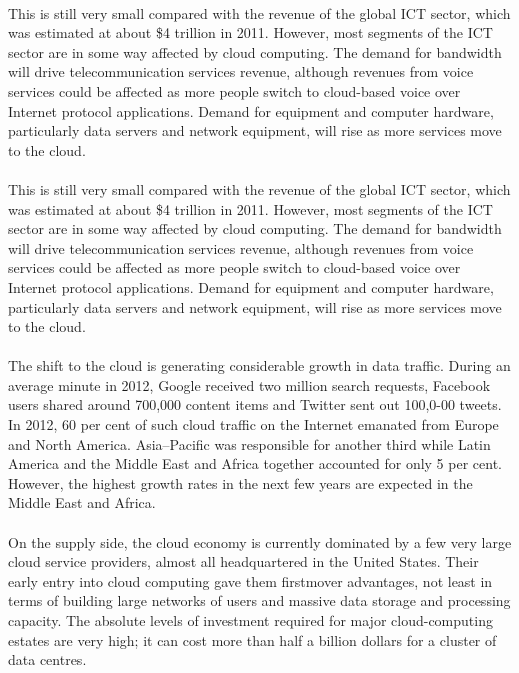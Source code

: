 \documentclass[a4paper, UTF8, 12pt]{article}
\begin{document}
\paragraph*{}
    This is still very small compared with the revenue of the global ICT sector, which was estimated at about \$4 trillion in 2011. However, most segments of the ICT sector are in some way affected by cloud computing. The demand for bandwidth will drive telecommunication services revenue, although revenues from voice services could be affected as more people switch to cloud-based voice over Internet protocol applications. Demand for equipment and computer hardware, particularly data servers and network equipment, will rise as more services move to the cloud. 

\paragraph*{}
    This is still very small compared with the revenue of the global ICT sector, which was estimated at about \$4 trillion in 2011. However, most segments of the ICT sector are in some way affected by cloud computing. The demand for bandwidth will drive telecommunication services revenue, although revenues from voice services could be affected as more people switch to cloud-based voice over Internet protocol applications. Demand for equipment and computer hardware, particularly data servers and network equipment, will rise as more services move to the cloud. 

\paragraph*{}
    The shift to the cloud is generating considerable growth in data traffic. During an average minute in 2012, Google received two million search requests, Facebook users shared around 700,000 content items and Twitter sent out 100,0-00 tweets. In 2012, 60 per cent of such cloud traffic on the Internet emanated from Europe and North America. Asia–Pacific was responsible for another third while Latin America and the Middle East and Africa together accounted for only 5 per cent. However, the highest growth rates in the next few years are expected in the Middle East and Africa. 

\paragraph*{}
    On the supply side, the cloud economy is currently dominated by a few very large cloud service providers, almost all headquartered in the United States. Their early entry into cloud computing gave them firstmover advantages, not least in terms of building large networks of users and massive data storage and processing capacity. The absolute levels of investment required for major cloud-computing estates are very high; it can cost more than half a billion dollars for a cluster of data centres.
\end{document}
